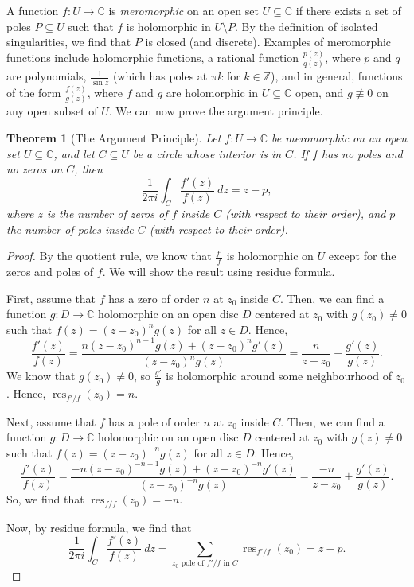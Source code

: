 \documentclass[a4paper, openany]{memoir}
\theoremstyle{definition}
\theoremstyle{plain}
\newtheorem{theorem}[definition]{Theorem}
\begin{document}
    A function $f \colon U \to \mathbb{C}$ is \emph{meromorphic} on an open set $U \subseteq \mathbb{C}$ if there exists a set of poles $P \subseteq U$ such that $f$ is holomorphic in $U \setminus P$. By the definition of isolated singularities, we find that $P$ is closed (and discrete). Examples of meromorphic functions include holomorphic functions, a rational function $\frac{p(z)}{q(z)}$, where $p$ and $q$ are polynomials, $\frac{1}{\sin z}$ (which has poles at $\pi k$ for $k \in \mathbb{Z}$), and in general, functions of the form $\frac{f(z)}{g(z)}$, where $f$ and $g$ are holomorphic in $U \subseteq \mathbb{C}$ open, and $g \not\equiv 0$ on any open subset of $U$. We can now prove the argument principle.
    \begin{theorem}[The Argument Principle]
        Let $f \colon U \to \mathbb{C}$ be meromorphic on an open set $U \subseteq \mathbb{C}$, and let $C \subseteq U$ be a circle whose interior is in $C$. If $f$ has no poles and no zeros on $C$, then
        \[\frac{1}{2\pi i} \int_C \frac{f'(z)}{f(z)} \ dz = z - p,\]
        where $z$ is the number of zeros of $f$ inside $C$ (with respect to their order), and $p$ the number of poles inside $C$ (with respect to their order).
    \end{theorem}
    \begin{proof}
        By the quotient rule, we know that $\frac{f'}{f}$ is holomorphic on $U$ except for the zeros and poles of $f$. We will show the result using residue formula.

        First, assume that $f$ has a zero of order $n$ at $z_0$ inside $C$. Then, we can find a function $g \colon D \to \mathbb{C}$ holomorphic on an open disc $D$ centered at $z_0$ with $g(z_0) \neq 0$ such that $f(z) = (z - z_0)^n g(z)$ for all $z \in D$. Hence,
        \[\frac{f'(z)}{f(z)} = \frac{n(z - z_0)^{n-1} g(z) + (z - z_0)^n g'(z)}{(z - z_0)^n g(z)} = \frac{n}{z - z_0} + \frac{g'(z)}{g(z)}.\]
        We know that $g(z_0) \neq 0$, so $\frac{g'}{g}$ is holomorphic around some neighbourhood of $z_0$. Hence, $\operatorname{res}_{f'/f}(z_0) = n$.

        Next, assume that $f$ has a pole of order $n$ at $z_0$ inside $C$. Then, we can find a function $g \colon D \to \mathbb{C}$ holomorphic on an open disc $D$ centered at $z_0$ with $g(z) \neq 0$ such that $f(z) = (z - z_0)^{-n} g(z)$ for all $z \in D$. Hence,
        \[\frac{f'(z)}{f(z)} = \frac{-n(z - z_0)^{-n-1} g(z) + (z - z_0)^{-n} g'(z)}{(z - z_0)^{-n} g(z)} = \frac{-n}{z - z_0} + \frac{g'(z)}{g(z)}.\]
        So, we find that $\operatorname{res}_{f
        /f}(z_0) = -n$.

        Now, by residue formula, we find that
        \[\frac{1}{2\pi i} \int_C \frac{f'(z)}{f(z)} \ dz = \sum_{z_0 \textrm{ pole of } f'/f \textrm{ in } C} \operatorname{res}_{f'/f}(z_0) = z - p.\]
    \end{proof}
\end{document}

